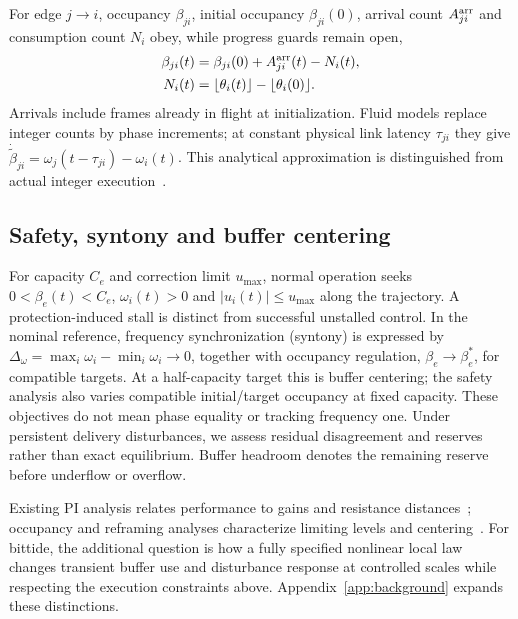 For edge $j\to i$, occupancy $\beta_{ji}$, initial occupancy
$\beta_{ji}(0)$, arrival count $A_{ji}^{\rm arr}$ and consumption
count $N_i$ obey, while progress guards remain open,
\begin{align}
 \beta_{ji}(t)&=\beta_{ji}(0)+A_{ji}^{\rm arr}(t)-N_i(t),\nonumber\\
 N_i(t)&=\lfloor\theta_i(t)\rfloor-\lfloor\theta_i(0)\rfloor.
 \label{eq:bg_count_balance}
\end{align}
Arrivals include frames already in flight at initialization. Fluid
models replace integer counts by phase increments; at constant physical
link latency $\tau_{ji}$ they give
$\dot{\widetilde\beta}_{ji}=\omega_j(t-\tau_{ji})-\omega_i(t)$.
This analytical approximation is distinguished from actual integer
execution~\cite{lall2022resistance,lall2024bufferOccupancy}.

\subsection{Safety, syntony and buffer centering}
For capacity $C_e$ and correction limit $u_{\max}$, normal operation
seeks $0<\beta_e(t)<C_e$, $\omega_i(t)>0$ and
$|u_i(t)|\le u_{\max}$ along the trajectory. A protection-induced
stall is distinct from successful unstalled control. In the nominal
reference, frequency synchronization (syntony) is expressed by
$\Delta_\omega=\max_i\omega_i-\min_i\omega_i\to0$, together with
occupancy regulation, $\beta_e\to\beta_e^*$, for compatible targets.
At a half-capacity target this is buffer centering; the safety analysis
also varies compatible initial/target occupancy at fixed capacity. These objectives
do not mean phase equality or tracking frequency one. Under persistent
delivery disturbances, we assess residual disagreement and reserves
rather than exact equilibrium. Buffer headroom denotes the remaining
reserve before underflow or overflow.

Existing PI analysis relates performance to gains and resistance
distances~\cite{lall2022resistance}; occupancy and reframing analyses
characterize limiting levels and centering~\cite{lall2024bufferOccupancy,lall2023bufferCentering}.
For bittide, the additional question is how a fully specified nonlinear
local law changes transient buffer use and disturbance response at
controlled scales while respecting the execution constraints above. Appendix~\ref{app:background} expands these distinctions.
